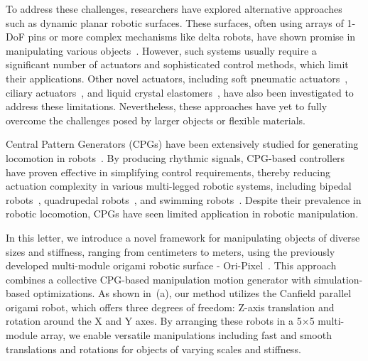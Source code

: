 To address these challenges, researchers have explored alternative approaches such as dynamic planar robotic surfaces. These surfaces, often using arrays of 1-DoF pins or more complex mechanisms like delta robots, have shown promise in manipulating various objects~\cite{leithinger_shape_2015, barr_smart_2013, follmer_inform_2013, xue_arraybot_2023, thompson_towards_2021, patil_linear_2023}. However, such systems usually require a significant number of actuators and sophisticated control methods, which limit their applications. Other novel actuators, including soft pneumatic actuators~\cite{deng_novel_2016, robertson_compact_2019}, ciliary actuators~\cite{ataka_design_2009}, and liquid crystal elastomers~\cite{liu_robotic_2021}, have also been investigated to address these limitations. Nevertheless, these approaches have yet to fully overcome the challenges posed by larger objects or flexible materials.

Central Pattern Generators (CPGs) have been extensively studied for generating locomotion in robots~\cite{ijspeert_central_2008}. By producing rhythmic signals, CPG-based controllers have proven effective in simplifying control requirements, thereby reducing actuation complexity in various multi-legged robotic systems, including bipedal robots~\cite{badri-sprowitz_birdbot_2022, 10499824}, quadrupedal robots~\cite{Cohen2003,cheetah2013,10175020}, and swimming robots~\cite{Porez2014,4459741}. Despite their prevalence in robotic locomotion, CPGs have seen limited application in robotic manipulation.

In this letter, we introduce a novel framework for manipulating objects of diverse sizes and stiffness, ranging from centimeters to meters, using the previously developed multi-module origami robotic surface - Ori-Pixel~\cite{Oripixel}. This approach combines a collective CPG-based manipulation motion generator with simulation-based optimizations. As shown in~(a), our method utilizes the Canfield parallel origami robot, which offers three degrees of freedom: Z-axis translation and rotation around the X and Y axes. By arranging these robots in a 5$\times$5 multi-module array, we enable versatile manipulations including fast and smooth translations and rotations for objects of varying scales and stiffness.

